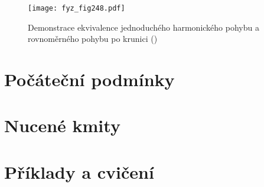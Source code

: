     \begin{figure}[ht!] %
      \centering
      \texttt{[image: fyz\_fig248.pdf]}
      \caption{Demonstrace ekvivalence jednoduchého harmonického pohybu a rovnoměrného pohybu po 
              krunici
              (\cite[s.~290]{Feynman01})}
      \label{fyz:fig248}
    \end{figure}

  \section{Počáteční podmínky}\label{fyz:IchapXXIsecIV}
  \section{Nucené kmity}\label{fyz:IchapXXIsecV}
  \section{Příklady a cvičení}\label{fyz:IchapXXIsecVI}

